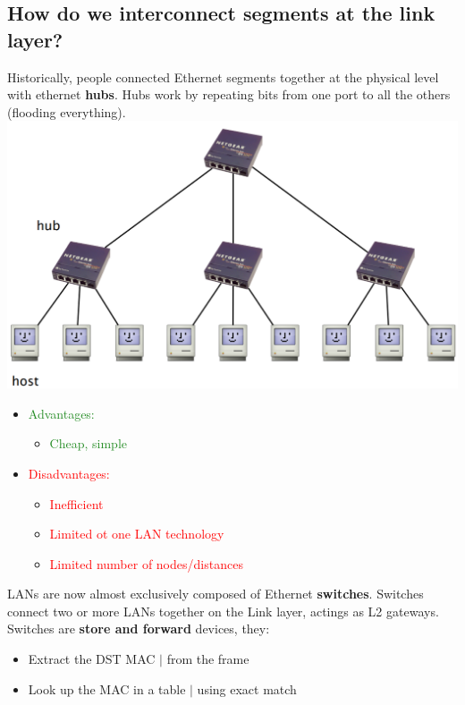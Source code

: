 \documentclass[a4paper, fontsize=8pt, landscape, DIV=1]{scrartcl}
\begin{document}
\begin{multicols*}{4}
			\subsection{How do we interconnect segments at the link layer?}
			Historically, people connected Ethernet segments together at the physical level with ethernet \textbf{hubs}. Hubs work by repeating bits from one port to all the others (flooding everything). 
			\includegraphics[width=\columnwidth]{images/Link_Layer/hub.png}
			\begin{itemize}[noitemsep]
				\item \textcolor{ForestGreen}{Advantages:}
				\begin{itemize}
					\item \textcolor{ForestGreen}{Cheap, simple}
				\end{itemize}
				\item \textcolor{red}{Disadvantages:}
				\begin{itemize}
					\item \textcolor{red}{Inefficient}
					\item \textcolor{red}{Limited ot one LAN technology}
					\item \textcolor{red}{Limited number of nodes/distances} 
				\end{itemize} 
			\end{itemize}
   			LANs are now almost exclusively composed of Ethernet \textbf{switches}. Switches connect two or more LANs together on the Link layer, actings as L2 gateways. Switches are \textbf{store and forward} devices, they: 
   			\begin{itemize}[noitemsep]
   				\item Extract the DST MAC $\vert$ from the frame
   				\item Look up the MAC in a table $\vert$ using exact match

\end{itemize}
\end{multicols*}
\end{document}
